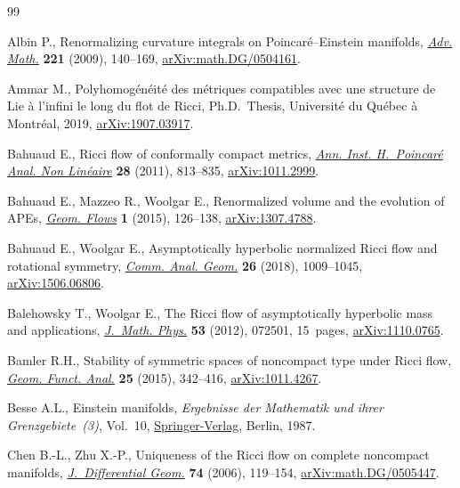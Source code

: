 \documentclass[pdftex]{sigma}
\numberwithin{equation}{section}
\begin{document}
\begin{thebibliography}{99}
\footnotesize\itemsep=0pt

Albin P., Renormalizing curvature integrals on {P}oincar\'{e}--{E}instein
 manifolds, \href{https://doi.org/10.1016/j.aim.2008.12.002}{\textit{Adv. Math.}} \textbf{221} (2009), 140--169,
 \href{https://arxiv.org/abs/math.DG/0504161}{arXiv:math.DG/0504161}.

Ammar M., Polyhomog\'en\'eit\'e des m\'etriques compatibles avec une structure
 de {L}ie \`a l'infini le long du flot de {R}icci, Ph.D.~Thesis, Universit\'e
 du Qu\'ebec \`a Montr\'eal, 2019, \href{https://arxiv.org/abs/1907.03917}{arXiv:1907.03917}.

Bahuaud E., Ricci flow of conformally compact metrics, \href{https://doi.org/10.1016/j.anihpc.2011.03.007}{\textit{Ann. Inst.
 H.~Poincar\'{e} Anal. Non Lin\'{e}aire}} \textbf{28} (2011), 813--835,
 \href{https://arxiv.org/abs/1011.2999}{arXiv:1011.2999}.

Bahuaud E., Mazzeo R., Woolgar E., Renormalized volume and the evolution of
 {APE}s, \href{https://doi.org/10.1515/geofl-2015-0007}{\textit{Geom. Flows}} \textbf{1} (2015), 126--138, \href{https://arxiv.org/abs/1307.4788}{arXiv:1307.4788}.

Bahuaud E., Woolgar E., Asymptotically hyperbolic normalized {R}icci flow and
 rotational symmetry, \href{https://doi.org/10.4310/CAG.2018.v26.n5.a1}{\textit{Comm. Anal. Geom.}} \textbf{26} (2018),
 1009--1045, \href{https://arxiv.org/abs/1506.06806}{arXiv:1506.06806}.

Balehowsky T., Woolgar E., The {R}icci flow of asymptotically hyperbolic mass
 and applications, \href{https://doi.org/10.1063/1.4732118}{\textit{J.~Math. Phys.}} \textbf{53} (2012), 072501,
 15~pages, \href{https://arxiv.org/abs/1110.0765}{arXiv:1110.0765}.

Bamler R.H., Stability of symmetric spaces of noncompact type under {R}icci
 flow, \href{https://doi.org/10.1007/s00039-015-0317-8}{\textit{Geom. Funct. Anal.}} \textbf{25} (2015), 342--416,
 \href{https://arxiv.org/abs/1011.4267}{arXiv:1011.4267}.

Besse A.L., Einstein manifolds, \textit{Ergebnisse der Mathematik und ihrer
 Grenzgebiete~(3)}, Vol.~10, \href{https://doi.org/10.1007/978-3-540-74311-8}{Springer-Verlag}, Berlin, 1987.

Chen B.-L., Zhu X.-P., Uniqueness of the {R}icci flow on complete noncompact
 manifolds, \href{https://doi.org/10.4310/jdg/1175266184}{\textit{J.~Differential Geom.}} \textbf{74} (2006), 119--154,
 \href{https://arxiv.org/abs/math.DG/0505447}{arXiv:math.DG/0505447}.


\end{thebibliography}
\end{document}
